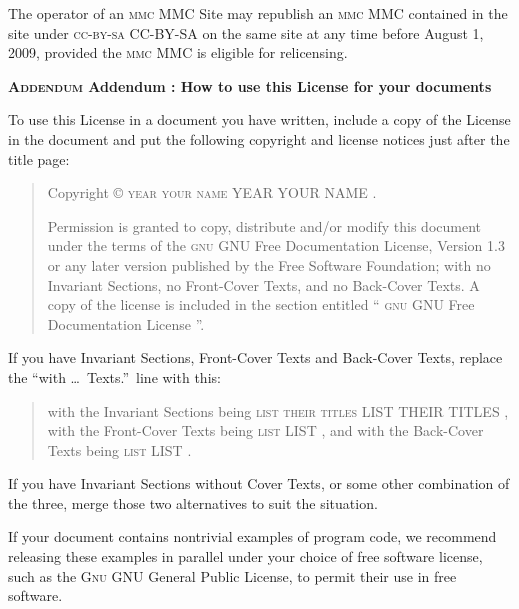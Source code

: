 The operator of an
\ifgfdl@sc
  \textsc{mmc}
\else
  MMC
\fi
Site may republish an
\ifgfdl@sc
  \textsc{mmc}
\else
  MMC
\fi
contained in the site under
\ifgfdl@sc
  \textsc{cc-by-sa}
\else
  CC-BY-SA
\fi
on the same site at any time before August 1, 2009, provided
the
\ifgfdl@sc
  \textsc{mmc}
\else
  MMC
\fi
is eligible for relicensing.

\medskip
\begin{center}
  \textbf{%
    \Large
    \ifgfdl@sc
      \textsc{Addendum}%
    \else
      Addendum%
    \fi
    : How to use this License for your documents
  }
\end{center}

\noindent
To use this License in a document you have written, include
a copy of the License in the document and put the following
copyright and license notices just after the title page:

\begin{quote}
  Copyright \copyright{}
  \ifgfdl@sc
    \textsc{year} \textsc{your} \textsc{name}%
  \else
    YEAR YOUR NAME%
  \fi
  .

  Permission is granted to copy, distribute and/or modify
  this document under the terms of the
  \ifgfdl@sc
    \textsc{gnu}
  \else
    GNU
  \fi
  Free
  Documentation License, Version 1.3 or any later version
  published by the Free Software Foundation; with no
  Invariant Sections, no Front-Cover Texts, and no
  Back-Cover Texts. A copy of the license is included in the
  section entitled \enquote{%
    \ifgfdl@sc
      \textsc{gnu}
    \else
      GNU
    \fi
    Free Documentation License%
  }.
\end{quote}

If you have Invariant Sections, Front-Cover Texts and
Back-Cover Texts, replace the \enquote{with \dots\ Texts.}\
line with this:

\begin{quote}
  with the Invariant Sections being
  \ifgfdl@sc
    \textsc{list} \textsc{their} \textsc{titles}%
  \else
    LIST THEIR TITLES%
  \fi
  , with
  the Front-Cover Texts being
  \ifgfdl@sc
    \textsc{list}%
  \else
    LIST%
  \fi
  , and with the Back-Cover Texts being
  \ifgfdl@sc
    \textsc{list}%
  \else
    LIST%
  \fi
  .
\end{quote}

If you have Invariant Sections without Cover Texts, or some
other combination of the three, merge those two alternatives
to suit the situation.

If your document contains nontrivial examples of program
code, we recommend releasing these examples in parallel
under your choice of free software license, such as the
\ifgfdl@sc
  \textsc{Gnu}
\else
  GNU
\fi
General Public License, to permit their use in free
software.
\makeatother
\endinput
